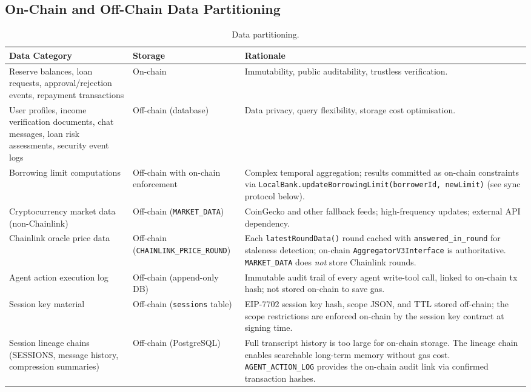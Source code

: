 \documentclass[12pt,a4paper]{report}
\newcommand{\tableheadcolor}{\rowcolor{TableHeadBg}}
\begin{document}
\subsection{On-Chain and Off-Chain Data Partitioning}
\label{sec:data-partitioning}

\begin{table}[H]
\centering
\caption[Data partitioning]{Data partitioning.}
\label{tab:data-partitioning}
\begin{tabular}{p{4.5cm}p{2.5cm}p{6.5cm}}
\toprule
\tableheadcolor
\textbf{Data Category} & \textbf{Storage} & \textbf{Rationale} \\
\midrule
Reserve balances, loan requests, approval/rejection events, repayment transactions & On-chain & Immutability, public auditability, trustless verification. \\
User profiles, income verification documents, chat messages, loan risk assessments, security event logs & Off-chain (database) & Data privacy, query flexibility, storage cost optimisation. \\
Borrowing limit computations & Off-chain with on-chain enforcement & Complex temporal aggregation; results committed as on-chain constraints via \texttt{LocalBank.updateBorrowingLimit(borrowerId, newLimit)} (see sync protocol below). \\
Cryptocurrency market data (non-Chainlink) & Off-chain (\texttt{MARKET\_DATA}) & CoinGecko and other fallback feeds; high-frequency updates; external API dependency. \\
Chainlink oracle price data & Off-chain (\texttt{CHAINLINK\_PRICE\_ROUND}) & Each \texttt{latestRoundData()} round cached with \texttt{answered\_in\_round} for staleness detection; on-chain \texttt{AggregatorV3Interface} is authoritative. \texttt{MARKET\_DATA} does \textit{not} store Chainlink rounds. \\
Agent action execution log & Off-chain (append-only DB) & Immutable audit trail of every agent write-tool call, linked to on-chain tx hash; not stored on-chain to save gas. \\
Session key material & Off-chain (\texttt{sessions} table) & EIP-7702 session key hash, scope JSON, and TTL stored off-chain; the scope restrictions are enforced on-chain by the session key contract at signing time. \\
Session lineage chains (SESSIONS, message history, compression summaries) & Off-chain (PostgreSQL) & Full transcript history is too large for on-chain storage. The lineage chain enables searchable long-term memory without gas cost. \texttt{AGENT\_ACTION\_LOG} provides the on-chain audit link via confirmed transaction hashes. \\
\bottomrule
\end{tabular}
\end{table}
\end{document}

